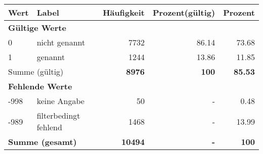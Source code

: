      \begin{longtable}{lXrrr}
     \toprule
     \textbf{Wert} & \textbf{Label} & \textbf{Häufigkeit} & \textbf{Prozent(gültig)} & \textbf{Prozent} \\
     \endhead
     \midrule
     \multicolumn{5}{l}{\textbf{Gültige Werte}}\\

     0 &
     \multicolumn{1}{X}{ nicht genannt   } &


       \num{7732} &
       \num[round-mode=places,round-precision=2]{86,14} &
         \num[round-mode=places,round-precision=2]{73,68} \\

     1 &
     \multicolumn{1}{X}{ genannt   } &


       \num{1244} &
       \num[round-mode=places,round-precision=2]{13,86} &
         \num[round-mode=places,round-precision=2]{11,85} \\
     \midrule
     \multicolumn{2}{l}{Summe (gültig)} &
       \textbf{\num{8976}} &
     \textbf{100} &
       \textbf{\num[round-mode=places,round-precision=2]{85,53}} \\
     \multicolumn{5}{l}{\textbf{Fehlende Werte}}\\
       -998 &
       keine Angabe &
         \num{50} &
        - &
         \num[round-mode=places,round-precision=2]{0,48} \\
       -989 &
       filterbedingt fehlend &
         \num{1468} &
        - &
         \num[round-mode=places,round-precision=2]{13,99} \\
     \midrule
     \multicolumn{2}{l}{\textbf{Summe (gesamt)}} &
          \textbf{\num{10494}} &
        \textbf{-} &
        \textbf{100} \\
     \bottomrule
     \end{longtable}
     
